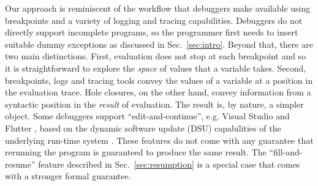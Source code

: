 
Our approach is reminiscent of the workflow that debuggers make available using breakpoints \cite{fitzgerald2008debugging,DBLP:journals/jfp/TolmachA95} and a variety of logging and tracing capabilities. Debuggers do not directly support incomplete programs, so the programmer first needs to insert suitable dummy exceptions as discussed in Sec.~\ref{sec:intro}. Beyond that, there are two main distinctions. First, evaluation does not stop at each breakpoint and so it is straightforward to explore the \emph{space} of values that a variable takes. Second, breakpoints, logs and tracing tools convey the values of a variable at a position in the evaluation trace. Hole closures, on the other hand, convey information from a syntactic position in the \emph{result} of evaluation. The result is, by nature, a simpler object.%
Some debuggers support ``edit-and-continue'', e.g. Visual Studio \cite{VSEditAndContinue} and Flutter \cite{flutter}, based on the dynamic software update (DSU) capabilities of the underlying run-time system \cite{DBLP:journals/toplas/StoyleHBSN07,DBLP:conf/vstte/HaydenMHFF12}. These features do not come with any guarantee that rerunning the program is  guaranteed to produce the same result. The ``fill-and-resume'' feature described in Sec.~\ref{sec:resumption} is a special case that comes with a stronger formal guarantee.

